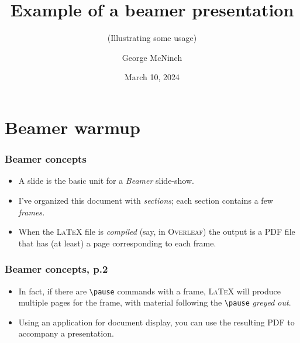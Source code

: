\documentclass{beamer}
\title{Example of a beamer presentation}
\subtitle[]{(Illustrating some usage)}
\date{March 10, 2024}
\author[] %
{George McNinch}
\institute%
{
  Department of Mathematics\\
  Tufts University
}
\theoremstyle{remark}
\begin{document}
\begin{frame}
  \titlepage
\end{frame}



\section{Beamer warmup}

\begin{frame}
  \frametitle{Beamer concepts}

  \begin{itemize}
  \item   A slide is the basic unit for a \emph{Beamer} slide-show.
    \pause

  \item I've organized this document with \emph{sections}; each section contains a few \emph{frames.}
    \pause

  \item When the \textsc{LaTeX} file is \emph{compiled} (say, in \textsc{Overleaf}) the output
    is a PDF file that has (at least) a page corresponding to  each frame.
  \end{itemize}

\end{frame}

\begin{frame}
  \frametitle{Beamer concepts, p.2}
  
  \begin{itemize}
  \item In fact, if there are \texttt{\textbackslash pause} commands
    with a frame, \textsc{LaTeX} will produce multiple pages for the
    frame, with material following the \texttt{\textbackslash pause}
    \emph{greyed out}.
    \pause
  \item Using an application for document display, you can use the
    resulting PDF to accompany a presentation.
  \end{itemize}
\end{frame}
\end{document}

